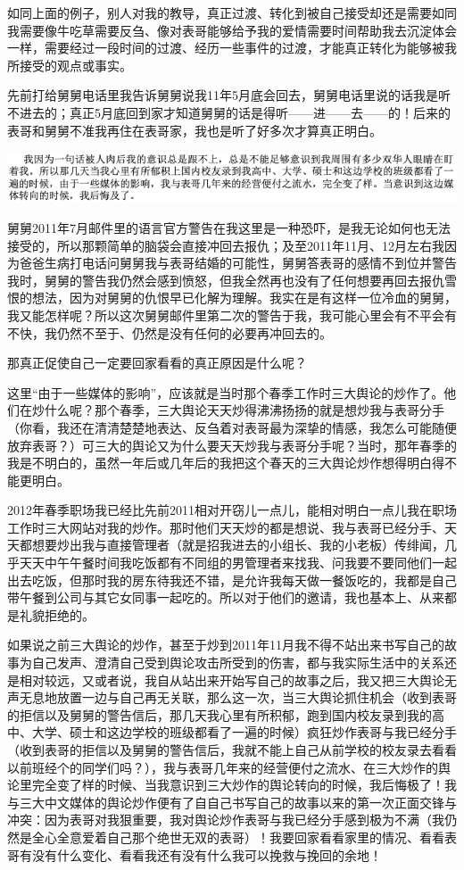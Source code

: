 \documentclass[9pt, b5paper]{article}
\begin{document}
如同上面的例子，别人对我的教导，真正过渡、转化到被自己接受却还是需要如同我需要像牛吃草需要反刍、像对表哥能够给予我的爱情需要时间帮助我去沉淀体会一样，需要经过一段时间的过渡、经历一些事件的过渡，才能真正转化为能够被我所接受的观点或事实。

先前打给舅舅电话里我告诉舅舅说我11年5月底会回去，舅舅电话里说的话我是听不进去的；真正5月底回到家才知道舅舅的话是得听——进——去——的！后来的表哥和舅舅不准我再住在表哥家，我也是听了好多次才算真正明白。

\begin{center}
\includegraphics[width=.9\linewidth]{./pic/p1p118-4.png}
\end{center}

舅舅2011年7月邮件里的语言官方警告在我这里是一种恐吓，是我无论如何也无法接受的，所以那颗简单的脑袋会直接冲回去报仇；及至2011年11月、12月左右我因为爸爸生病打电话问舅舅我与表哥结婚的可能性，舅舅答表哥的感情不到位并警告我时，舅舅的警告我仍然会感到愤怒，但我全然再也没有了任何想要再回去报仇雪恨的想法，因为对舅舅的仇恨早已化解为理解。我实在是有这样一位冷血的舅舅，我又能怎样呢？所以这次舅舅邮件里第二次的警告于我，我可能心里会有不平会有不快，我仍然不至于、仍然是没有任何的必要再冲回去的。

那真正促使自己一定要回家看看的真正原因是什么呢？

这里“由于一些媒体的影响”，应该就是当时那个春季工作时三大舆论的炒作了。他们在炒什么呢？那个春季，三大舆论天天炒得沸沸扬扬的就是想炒我与表哥分手（你看，我还在清清楚楚地表达、反刍着对表哥最为深挚的情感，我怎么可能随便放弃表哥？）可三大的舆论又为什么要天天炒我与表哥分手呢？当时，那年春季的我是不明白的，虽然一年后或几年后的我把这个春天的三大舆论炒作想得明白得不能更明白。

2012年春季职场我已经比先前2011相对开窃儿一点儿，能相对明白一点儿我在职场工作时三大网站对我的炒作。那时他们天天炒的都是想说、我与表哥已经分手、天天都想要炒出我与直接管理者（就是招我进去的小组长、我的小老板）传绯闻，几乎天天中午午餐时间我吃饭都有不同组的男管理者来找我、问我要不要同他们一起出去吃饭，但那时我的房东待我还不错，是允许我每天做一餐饭吃的，我都是自己带午餐到公司与其它女同事一起吃的。所以对于他们的邀请，我也基本上、从来都是礼貌拒绝的。

如果说之前三大舆论的炒作，甚至于炒到2011年11月我不得不站出来书写自己的故事为自己发声、澄清自己受到舆论攻击所受到的伤害，都与我实际生活中的关系还是相对较远，又或者说，我自从站出来开始写自己的故事之后，我又把三大舆论无声无息地放置一边与自己再无关联，那么这一次，当三大舆论抓住机会（收到表哥的拒信以及舅舅的警告信后，那几天我心里有所积郁，跑到国内校友录到我的高中、大学、硕士和这边学校的班级都看了一遍的时候）疯狂炒作表哥与我已经分手（收到表哥的拒信以及舅舅的警告信后，我就不能上自己从前学校的校友录去看看以前班经个的同学们吗？），我与表哥几年来的经营便付之流水、在三大炒作的舆论里完全变了样的时候、当我意识到三大炒作的舆论转向的时候，我后悔极了！我与三大中文媒体的舆论炒作便有了自自己书写自己的故事以来的第一次正面交锋与冲突：因为表哥对我狠重要，我对舆论炒作表哥与我已经分手感到极为不满（我仍然是全心全意爱着自己那个绝世无双的表哥）！我要回家看看家里的情况、看看表哥有没有什么变化、看看我还有没有什么我可以挽救与挽回的余地！
\end{document}
